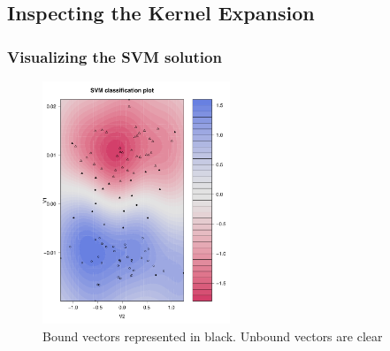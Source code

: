\documentclass[11pt]{article}
\begin{document}
\subsection{Inspecting the Kernel Expansion}
\subsubsection{Visualizing the SVM solution}
\begin{figure}[h!]
  \centering
\includegraphics[width=0.5\textwidth]{2-2.pdf}
\caption{ Bound vectors represented in black. Unbound vectors are clear }
\label{bound}
\end{figure}
\end{document}
